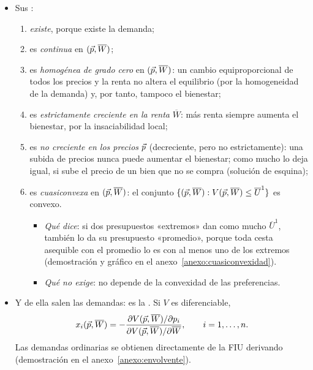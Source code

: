 \documentclass[11pt]{article}
\begin{document}
\begin{itemize}
\begin{equation}
  \end{equation}
  Da el nivel de utilidad óptimo para cada combinación de parámetros sin volver a resolver el problema. De ahí su nombre: la utilidad depende \emph{indirectamente} de los precios y la renta, a través de la maximización, mientras que en $U(\vect{x})$ depende directamente de las cantidades.
\item Sus \nocite{MasColellWhinstonGreen1995}:
  \begin{enumerate}
  \item \emph{existe}, porque existe la demanda;
  \item es \emph{continua} en $(\vec{p},\overline{W})$;
  \item es \emph{homogénea de grado cero} en $(\vec{p},\overline{W})$: un cambio equiproporcional de todos los precios y la renta no altera el equilibrio (por la homogeneidad de la demanda) y, por tanto, tampoco el bienestar;
  \item es \emph{estrictamente creciente en la renta} $\overline{W}$: más renta siempre aumenta el bienestar, por la insaciabilidad local;
  \item es \emph{no creciente en los precios} $\vec{p}$ (decreciente, pero no estrictamente): una subida de precios nunca puede aumentar el bienestar; como mucho lo deja igual, si sube el precio de un bien que no se compra (solución de esquina);
  \item es \emph{cuasiconvexa} en $(\vec{p},\overline{W})$: el conjunto $\{(\vec{p},\overline{W}): V(\vec{p},\overline{W})\leq\overline{U}^1\}$ es convexo.
    \begin{itemize}
    \item \emph{Qué dice}: si dos presupuestos «extremos» dan como mucho $\overline{U}^1$, también lo da su presupuesto «promedio», porque toda cesta asequible con el promedio lo es con al menos uno de los extremos (demostración y gráfico en el anexo~\ref{anexo:cuasiconvexidad}).
    \item \emph{Qué no exige}: no depende de la convexidad de las preferencias.
    \end{itemize}
  \end{enumerate}
\item Y de ella salen las demandas: es la \nocite{Roy1947Distribution}. Si $V$ es diferenciable,
    \begin{equation}
    x_i(\vec{p},\overline{W})=-\frac{\partial V(\vec{p},\overline{W})/\partial p_i}{\partial V(\vec{p},\overline{W})/\partial\overline{W}},\qquad i=1,\dots,n. \label{eq:roy}
    \end{equation}
    Las demandas ordinarias se obtienen directamente de la FIU derivando (demostración en el anexo~\ref{anexo:envolvente}).
\end{itemize}
\end{document}

